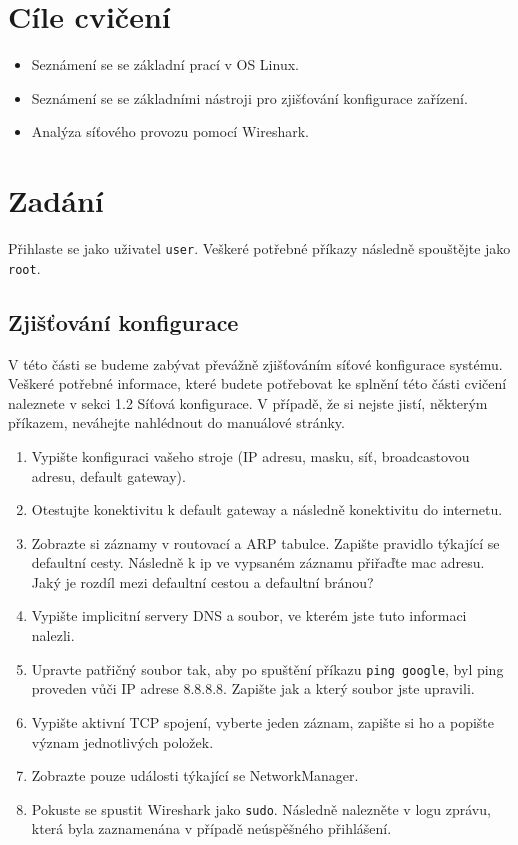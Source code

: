 \section{Cíle cvičení}
\begin{itemize}
	\item Seznámení se se základní prací v OS Linux.
	\item Seznámení se se základními nástroji pro zjišťování konfigurace zařízení.
	\item Analýza síťového provozu pomocí Wireshark.
\end{itemize}

\section{Zadání}
Přihlaste se jako uživatel \texttt{user}. Veškeré potřebné příkazy následně spouštějte jako \texttt{root}.

\subsection{Zjišťování konfigurace}
V této části se budeme zabývat převážně zjišťováním síťové konfigurace systému. Veškeré potřebné informace, které budete potřebovat ke splnění této části cvičení naleznete v sekci 1.2 Síťová konfigurace. V případě, že si nejste jistí, některým příkazem, neváhejte nahlédnout do manuálové stránky.

\begin{enumerate}
\item Vypište konfiguraci vašeho stroje (IP adresu, masku, síť, broadcastovou adresu, default gateway).
\item Otestujte konektivitu k default gateway a následně konektivitu do internetu.
\item Zobrazte si záznamy v routovací a ARP tabulce. Zapište pravidlo týkající se defaultní cesty. Následně k ip ve vypsaném záznamu přiřaďte mac adresu. Jaký je rozdíl mezi defaultní cestou a defaultní bránou?
\item Vypište implicitní servery DNS a soubor, ve kterém jste tuto informaci nalezli.
\item Upravte patřičný soubor tak, aby po spuštění příkazu \texttt{ping google}, byl ping proveden vůči IP adrese 8.8.8.8. Zapište jak a který soubor jste upravili.
\item Vypište aktivní TCP spojení, vyberte jeden záznam, zapište si ho a popište význam jednotlivých položek.
\item Zobrazte pouze události týkající se NetworkManager.
\item Pokuste se spustit Wireshark jako \texttt{sudo}. Následně nalezněte v logu zprávu, která byla zaznamenána v případě neúspěšného přihlášení.
\end{enumerate}

